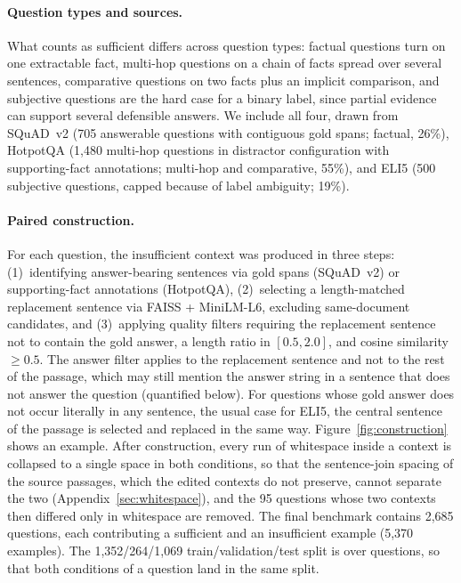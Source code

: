 \documentclass[acmsmall,screen,review]{acmart}
\begin{document}
\paragraph{Question types and sources.}
What counts as sufficient differs across question types: factual questions turn on one extractable fact, multi-hop questions on a chain of facts spread over several sentences, comparative questions on two facts plus an implicit comparison, and subjective questions are the hard case for a binary label, since partial evidence can support several defensible answers. We include all four, drawn from SQuAD~v2 \citep{rajpurkar2018squad} (705 answerable questions with contiguous gold spans; factual, 26\%), HotpotQA \citep{yang2018hotpotqa} (1,480 multi-hop questions in distractor configuration with supporting-fact annotations; multi-hop and comparative, 55\%), and ELI5 \citep{fan2019eli5} (500 subjective questions, capped because of label ambiguity; 19\%).

\paragraph{Paired construction.}
For each question, the insufficient context was produced in three steps: (1)~identifying answer-bearing sentences via gold spans (SQuAD~v2) or supporting-fact annotations (HotpotQA), (2)~selecting a length-matched replacement sentence via FAISS + MiniLM-L6, excluding same-document candidates, and (3)~applying quality filters requiring the replacement sentence not to contain the gold answer, a length ratio in $[0.5,2.0]$, and cosine similarity $\geq 0.5$. The answer filter applies to the replacement sentence and not to the rest of the passage, which may still mention the answer string in a sentence that does not answer the question (quantified below). For questions whose gold answer does not occur literally in any sentence, the usual case for ELI5, the central sentence of the passage is selected and replaced in the same way. Figure~\ref{fig:construction} shows an example. After construction, every run of whitespace inside a context is collapsed to a single space in both conditions, so that the sentence-join spacing of the source passages, which the edited contexts do not preserve, cannot separate the two (Appendix~\ref{sec:whitespace}), and the 95 questions whose two contexts then differed only in whitespace are removed. The final benchmark contains 2,685 questions, each contributing a sufficient and an insufficient example (5,370 examples). The 1,352/264/1,069 train/validation/test split is over questions, so that both conditions of a question land in the same split.
\end{document}
